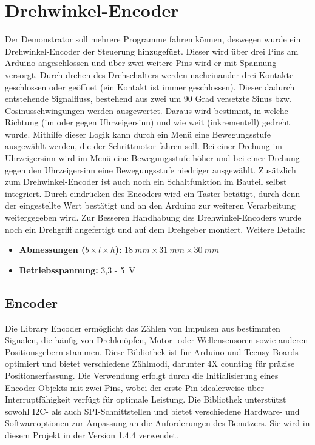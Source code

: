 %
%

\chapter{Drehwinkel-Encoder}

Der Demonstrator soll mehrere Programme fahren können, deswegen wurde ein Drehwinkel-Encoder der Steuerung hinzugefügt. Dieser wird über drei Pins am Arduino angeschlossen und über zwei weitere Pins wird er mit Spannung versorgt. Durch drehen des Drehschalters werden nacheinander drei Kontakte geschlossen oder geöffnet (ein Kontakt ist immer geschlossen). Dieser dadurch entstehende Signalfluss, bestehend aus zwei um 90 Grad versetzte Sinus bzw. Cosinusschwingungen werden ausgewertet. Daraus wird bestimmt, in welche Richtung (im oder gegen Uhrzeigersinn) und wie weit (inkrementell) gedreht wurde. Mithilfe dieser Logik kann durch ein Menü eine Bewegungsstufe ausgewählt werden, die der Schrittmotor fahren soll.\cite{Basler:2016} Bei einer Drehung im Uhrzeigersinn wird im Menü eine Bewegungsstufe höher und bei einer Drehung gegen den Uhrzeigersinn eine Bewegungsstufe niedriger ausgewählt. Zusätzlich zum Drehwinkel-Encoder ist auch noch ein Schaltfunktion im Bauteil selbst integriert. Durch eindrücken des Encoders wird ein Taster betätigt, durch denn der eingestellte Wert bestätigt und an den Arduino zur weiteren Verarbeitung weitergegeben wird. Zur Besseren Handhabung des Drehwinkel-Encoders wurde noch ein Drehgriff angefertigt und auf dem Drehgeber montiert.
Weitere Details: 
\begin{itemize}
    \item \textbf{Abmessungen ($b \times l \times h$):} $18 \ mm \times 31 \ mm \times 30 \ mm$
    \item \textbf{Betriebsspannung:} 3,3 - 5\ V
    \cite{Simac:2019c}
\end{itemize}

\section{Encoder}

Die  Library Encoder ermöglicht das Zählen von Impulsen aus bestimmten Signalen, die häufig von Drehknöpfen, Motor- oder Wellensensoren sowie anderen Positionsgebern stammen. Diese Bibliothek ist für Arduino und Teensy Boards optimiert und bietet verschiedene Zählmodi, darunter 4X counting für präzise Positionserfassung. Die Verwendung erfolgt durch die Initialisierung eines Encoder-Objekts mit zwei Pins, wobei der erste Pin idealerweise über Interruptfähigkeit verfügt für optimale Leistung. Die Bibliothek unterstützt sowohl I2C- als auch SPI-Schnittstellen und bietet verschiedene Hardware- und Softwareoptionen zur Anpassung an die Anforderungen des Benutzers. Sie wird in diesem Projekt in der Version 1.4.4 verwendet.\cite{Stoffregen:2024}

